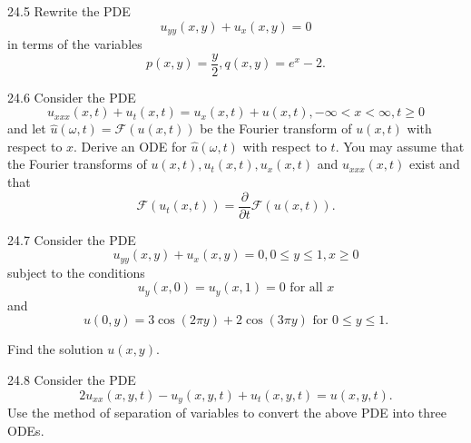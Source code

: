 \begin{problem}{24.5}
  Rewrite the PDE
  \begin{equation*}
    u_{y y}(x,y) + u_x(x,y) = 0
  \end{equation*}
  in terms of the variables
  \begin{equation*}
    p(x,y) = \frac{y}{2}, q(x,y) = e^{x}-2
  .\end{equation*}
\end{problem}

\begin{problem}{24.6}
  Consider the PDE
  \begin{equation*}
    u_{x x x}(x,t) + u_t(x,t) = u_x(x,t) + u(x,t), -\infty < x < \infty, t \geq 0
  \end{equation*}
  and let $\hat{u}(\omega, t) = \mathcal{F}(u(x,t))$ be the Fourier transform of $u(x,t)$ with respect to $x$.
  Derive an ODE for $\hat{u}(\omega, t)$ with respect to $t$.
  You may assume that the Fourier transforms of $u(x,t), u_t(x,t), u_x(x,t)$ and $u_{x x x}(x,t)$ exist  and that
  \begin{equation*}
    \mathcal{F}(u_t(x,t)) = \frac{\partial }{\partial t} \mathcal{F}\left( u(x,t) \right)
  .\end{equation*}
\end{problem}

\begin{problem}{24.7}
  Consider the PDE
  \begin{equation*}
    u_{y y}(x,y) + u_x(x,y) = 0, 0 \leq y \leq 1, x \geq 0
  \end{equation*}
  subject to the conditions
  \begin{equation*}
    u_y(x,0) = u_y(x,1) = 0 \text{ for all } x
  \end{equation*}
  and
  \begin{equation*}
    u(0,y) = 3 \cos (2 \pi y) + 2 \cos (3\pi y) \text{ for } 0 \leq y \leq 1
  .\end{equation*}

  Find the solution $u(x,y)$.
\end{problem}

\begin{problem}{24.8}
  Consider the PDE
  \begin{equation*}
    2u_{x x}(x,y,t) - u_y(x,y,t) + u_t(x,y,t) = u(x,y,t)
  .\end{equation*}
  Use the method of separation of variables to convert the above PDE into three ODEs.
\end{problem}
